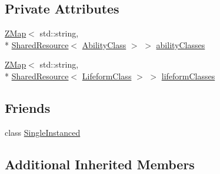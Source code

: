 \subsection*{Private Attributes}
\begin{DoxyCompactItemize}
\item 
\hyperlink{namespaceZeta_a9af2e12c4e432d2a1725f19e5a648a04}{Z\+Map}$<$ std\+::string, \\*
\hyperlink{classZeta_1_1SharedResource}{Shared\+Resource}$<$ \hyperlink{classZeta_1_1AbilityClass}{Ability\+Class} $>$ $>$ \hyperlink{classZeta_1_1ResourceCache_abc312f77d6f49e402cbdf9681610c578}{ability\+Classes}
\item 
\hyperlink{namespaceZeta_a9af2e12c4e432d2a1725f19e5a648a04}{Z\+Map}$<$ std\+::string, \\*
\hyperlink{classZeta_1_1SharedResource}{Shared\+Resource}$<$ \hyperlink{classZeta_1_1LifeformClass}{Lifeform\+Class} $>$ $>$ \hyperlink{classZeta_1_1ResourceCache_a9b038082ffed4386c9515bfc82e0c4c7}{lifeform\+Classes}
\end{DoxyCompactItemize}
\subsection*{Friends}
\begin{DoxyCompactItemize}
\item 
class \hyperlink{classZeta_1_1ResourceCache_a2fa95d69b32a77fffa4b730679a8b08c}{Single\+Instanced}
\end{DoxyCompactItemize}
\subsection*{Additional Inherited Members}


